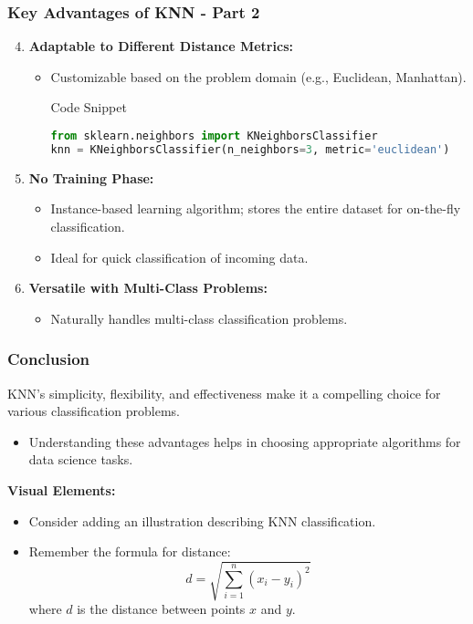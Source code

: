 \documentclass[aspectratio=169]{beamer}
\begin{document}
\begin{frame}[fragile]
    \frametitle{Key Advantages of KNN - Part 2}
    \begin{enumerate}
        \setcounter{enumi}{3}  %
        \item \textbf{Adaptable to Different Distance Metrics:} 
            \begin{itemize}
                \item Customizable based on the problem domain (e.g., Euclidean, Manhattan).
                \begin{block}{Code Snippet}
                    \begin{lstlisting}[language=Python]
from sklearn.neighbors import KNeighborsClassifier
knn = KNeighborsClassifier(n_neighbors=3, metric='euclidean')
                    \end{lstlisting}
                \end{block}
            \end{itemize}
        
        \item \textbf{No Training Phase:} 
            \begin{itemize}
                \item Instance-based learning algorithm; stores the entire dataset for on-the-fly classification.
                \item Ideal for quick classification of incoming data.
            \end{itemize}
        
        \item \textbf{Versatile with Multi-Class Problems:}
            \begin{itemize}
                \item Naturally handles multi-class classification problems.
            \end{itemize}
    \end{enumerate}
\end{frame}

\begin{frame}[fragile]
    \frametitle{Conclusion}
    KNN's simplicity, flexibility, and effectiveness make it a compelling choice for various classification problems.
    \begin{itemize}
        \item Understanding these advantages helps in choosing appropriate algorithms for data science tasks.
    \end{itemize}
    
    \textbf{Visual Elements:}
    \begin{itemize}
        \item Consider adding an illustration describing KNN classification.
        \item Remember the formula for distance: 
        \begin{equation}
            d = \sqrt{\sum_{i=1}^{n}(x_i - y_i)^2}
        \end{equation}
        where \(d\) is the distance between points \(x\) and \(y\).
    \end{itemize}
\end{frame}
\end{document}
